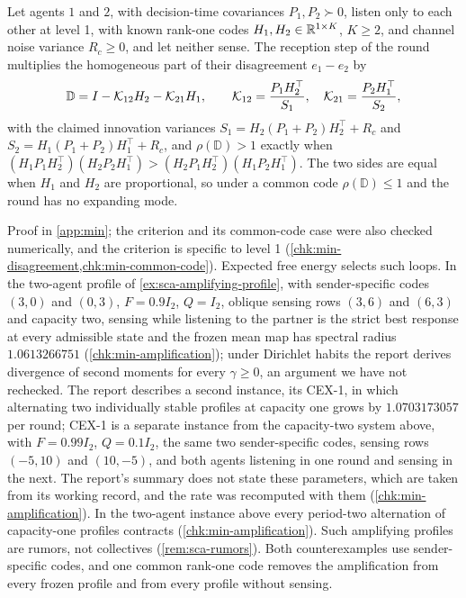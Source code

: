 \begin{lemma}\label{lem:min-disagreement}
Let agents $1$ and $2$, with decision-time covariances $P_1,P_2\succ0$, listen only to each other at level 1, with known rank-one codes $H_1,H_2\in\mathbb{R}^{1\times K}$, $K\ge2$, and channel noise variance $R_c\ge0$, and let neither sense. The reception step of the round multiplies the homogeneous part of their disagreement $e_1-e_2$ by
\[
\mathbb D=I-\mathcal{K}_{12}H_2-\mathcal{K}_{21}H_1,\qquad\mathcal{K}_{12}=\frac{P_1H_2^\top}{S_1},\quad\mathcal{K}_{21}=\frac{P_2H_1^\top}{S_2},
\]
with the claimed innovation variances $S_1=H_2(P_1+P_2)H_2^\top+R_c$ and $S_2=H_1(P_1+P_2)H_1^\top+R_c$, and $\rho(\mathbb D)>1$ exactly when $(H_1P_1H_2^\top)(H_2P_2H_1^\top)>(H_2P_1H_2^\top)(H_1P_2H_1^\top)$. The two sides are equal when $H_1$ and $H_2$ are proportional, so under a common code $\rho(\mathbb D)\le1$ and the round has no expanding mode.
\end{lemma}
Proof in \cref{app:min}; the criterion and its common-code case were also checked numerically, and the criterion is specific to level 1 (\cref{chk:min-disagreement,chk:min-common-code}). Expected free energy selects such loops. In the two-agent profile of \cref{ex:sca-amplifying-profile}, with sender-specific codes $(3,0)$ and $(0,3)$, $F=0.9I_2$, $Q=I_2$, oblique sensing rows $(3,6)$ and $(6,3)$ and capacity two, sensing while listening to the partner is the strict best response at every admissible state and the frozen mean map has spectral radius $1.0613266751$ (\cref{chk:min-amplification}); under Dirichlet habits the report derives divergence of second moments for every $\gamma\ge0$, an argument we have not rechecked. The report describes a second instance, its CEX-1, in which alternating two individually stable profiles at capacity one grows by $1.0703173057$ per round; CEX-1 is a separate instance from the capacity-two system above, with $F=0.99I_2$, $Q=0.1I_2$, the same two sender-specific codes, sensing rows $(-5,10)$ and $(10,-5)$, and both agents listening in one round and sensing in the next. The report's summary does not state these parameters, which are taken from its working record, and the rate was recomputed with them (\cref{chk:min-amplification}). In the two-agent instance above every period-two alternation of capacity-one profiles contracts (\cref{chk:min-amplification}). Such amplifying profiles are rumors, not collectives (\cref{rem:sca-rumors}). Both counterexamples use sender-specific codes, and one common rank-one code removes the amplification from every frozen profile and from every profile without sensing.

